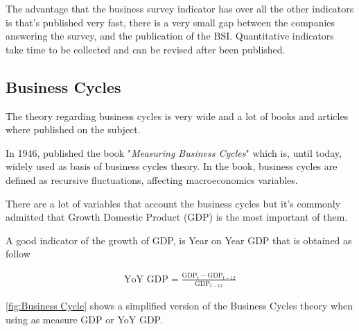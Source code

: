 \documentclass[12pt,a4paper,oneside]{book}
\begin{document}
The advantage that the business survey indicator has over all the other indicators is that's published very fast, there is a very small gap between the companies answering the survey, and the publication of the BSI. 
Quantitative indicators take time to be collected and can be revised after been published.


\subsection{Business Cycles}
\label{sec:Business Cycles}

The theory regarding business cycles is very wide and a lot of books and articles where published on the subject. 

In 1946, \citeauthor{mitchell_measuring_1946} published the book "\textit{Measuring Business Cycles}" which is, until today, widely used as basis of business cycles theory.
In the book, business cycles are defined as recursive fluctuations, affecting macroeconomics variables.

There are a lot of variables that account the business cycles but it's commonly admitted that Growth Domestic Product (GDP) is the most important of them.

A good indicator of the growth of GDP, is Year on Year GDP that is obtained as follow

\begin{eqnarray}
   \mbox{YoY GDP} = \frac{\mbox{GDP}_t - \mbox{GDP}_{t-12}}{\mbox{GDP}_{t-12}} 
\end{eqnarray}

\autoref{fig:Business Cycle} shows a simplified version of the Business Cycles theory when using as measure GDP or YoY GDP.
\end{document}
